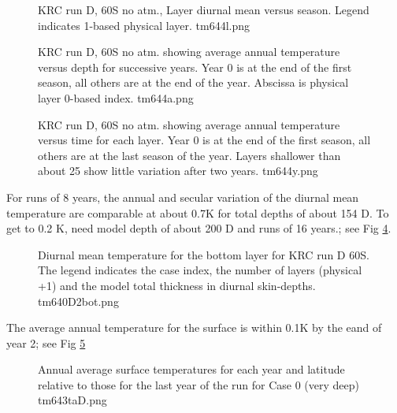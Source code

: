 \documentclass{article}
\begin{document}
\begin{figure}[!ht] 
\caption[60S no atm., Layer diurnal mean versus season ]{KRC run D, 60S no atm.,
  Layer diurnal mean versus season.  Legend indicates 1-based physical layer.
\label{tm644l} tm644l.png  }
\end{figure} 


\begin{figure}[!ht] 
\caption[60S no atm., successive years ]{KRC run D, 60S no atm. showing average
  annual temperature versus depth for successive years. Year 0 is at the end of
  the first season, all others are at the end of the year. Abscissa is physical
  layer 0-based index.
\label{tm644a} tm644a.png  }
\end{figure} 

\begin{figure}[!ht] 
\caption[60S no atm., successive years ]{KRC run D, 60S no atm. showing average
  annual temperature versus time for each layer.  Year 0 is at the end of the
  first season, all others are at the last season of the year. Layers shallower
  than about 25 show little variation after two years.
\label{tm644y} tm644y.png  }
\end{figure} 


For runs of 8 years, the annual and secular variation of the diurnal mean
temperature are comparable at about 0.7K for total depths of about 154 D. To get
to 0.2 K, need model depth of about 200 D and runs of 16 years.; see Fig
 \ref{tm640D2bot}.

\begin{figure}[!ht] 
\caption[KRC run D 60S bottom layers]{Diurnal mean temperature for the bottom
  layer for KRC run D 60S.  The legend indicates the case index, the number of
  layers (physical +1) and the model total thickness in diurnal skin-depths.
\label{tm640D2bot} tm640D2bot.png  }
\end{figure} 

The average annual temperature for the surface is within 0.1K by the eand of year 2; see Fig \ref{tm643taD} 

\begin{figure}[!ht] 
\caption[Run D bottom]{Annual average surface temperatures for each year and
  latitude relative to those for the last year of the run for Case 0 (very deep)
\label{tm643taD}  tm643taD.png }
\end{figure} 
\end{document}
